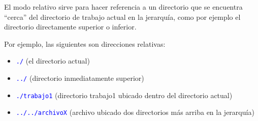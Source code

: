 \documentclass[12pt]{article}
\newcommand{\cw}[1]{\texttt{\textcolor{blue}{#1}}}
\begin{document}
El modo relativo sirve para hacer referencia a un directorio que se encuentra
``cerca'' del directorio de trabajo actual en la jerarquía, como por ejemplo
el directorio directamente superior o inferior.

Por ejemplo, las siguientes son direcciones relativas:

\vspace{-2\topsep}
\begin{itemize}

    \itemsep2pt \parskip0pt 

    \item \cw{./} (el directorio actual)

    \item \cw{../} (directorio inmediatamente superior)

    \item \cw{./trabajo1} (directorio trabajo1 ubicado dentro del directorio
        actual)

    \item \cw{../../archivoX} (archivo ubicado dos directorios más arriba en
        la jerarquía)

\end{itemize}
\end{document}
